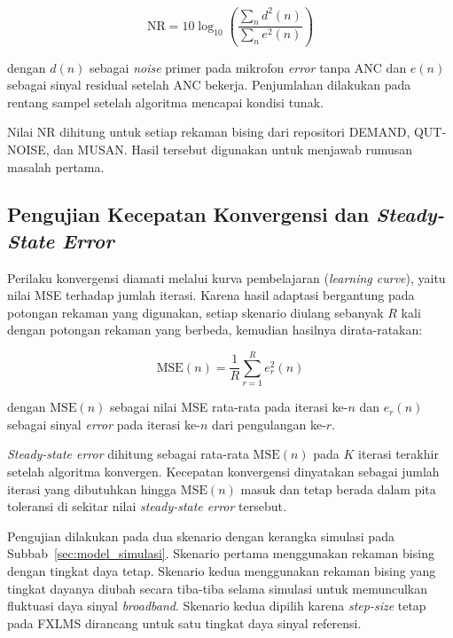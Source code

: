 \begin{equation}
  \label{eq:3_1}
  \mathrm{NR} = 10\log_{10}\left(\frac{\sum_{n} d^2(n)}{\sum_{n} e^2(n)}\right)
\end{equation}

dengan $d(n)$ sebagai \emph{noise} primer pada mikrofon \emph{error} tanpa ANC dan $e(n)$ sebagai sinyal residual setelah ANC bekerja. Penjumlahan dilakukan pada rentang sampel setelah algoritma mencapai kondisi tunak.

Nilai NR dihitung untuk setiap rekaman bising dari repositori DEMAND, QUT-NOISE, dan MUSAN. Hasil tersebut digunakan untuk menjawab rumusan masalah pertama.

\subsection{Pengujian Kecepatan Konvergensi dan \emph{Steady-State Error}}
\label{sec:uji_konvergensi}

Perilaku konvergensi diamati melalui kurva pembelajaran (\emph{learning curve}), yaitu nilai MSE terhadap jumlah iterasi. Karena hasil adaptasi bergantung pada potongan rekaman yang digunakan, setiap skenario diulang sebanyak $R$ kali dengan potongan rekaman yang berbeda, kemudian hasilnya dirata-ratakan:

\begin{equation}
  \label{eq:3_2}
  \mathrm{MSE}(n) = \frac{1}{R}\sum_{r=1}^{R} e_r^2(n)
\end{equation}

dengan $\mathrm{MSE}(n)$ sebagai nilai MSE rata-rata pada iterasi ke-$n$ dan $e_r(n)$ sebagai sinyal \emph{error} pada iterasi ke-$n$ dari pengulangan ke-$r$.

\emph{Steady-state error} dihitung sebagai rata-rata $\mathrm{MSE}(n)$ pada $K$ iterasi terakhir setelah algoritma konvergen. Kecepatan konvergensi dinyatakan sebagai jumlah iterasi yang dibutuhkan hingga $\mathrm{MSE}(n)$ masuk dan tetap berada dalam pita toleransi di sekitar nilai \emph{steady-state error} tersebut.

Pengujian dilakukan pada dua skenario dengan kerangka simulasi pada Subbab~\ref{sec:model_simulasi}. Skenario pertama menggunakan rekaman bising dengan tingkat daya tetap. Skenario kedua menggunakan rekaman bising yang tingkat dayanya diubah secara tiba-tiba selama simulasi untuk memunculkan fluktuasi daya sinyal \emph{broadband}. Skenario kedua dipilih karena \emph{step-size} tetap pada FXLMS dirancang untuk satu tingkat daya sinyal referensi.

